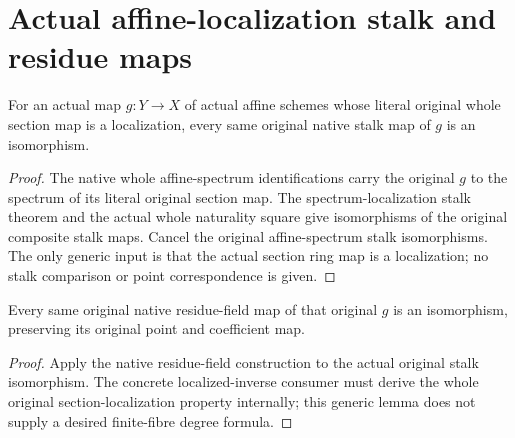 \section{Actual affine-localization stalk and residue maps}

\begin{theorem}
\label{thm:fc-affine-localization-native-stalks}
\leanok
{}
For an actual map $g:Y\to X$ of actual affine schemes whose literal original
whole section map is a localization, every same original native stalk map
of $g$ is an isomorphism.
\end{theorem}
\begin{proof}
The native whole affine-spectrum identifications carry the original $g$ to
the spectrum of its literal original section map.  The spectrum-localization
stalk theorem and the actual whole naturality square give isomorphisms of
the original composite stalk maps.  Cancel the original affine-spectrum
stalk isomorphisms.  The only generic input is that the actual section ring
map is a localization; no stalk comparison or point correspondence is given.
\end{proof}

\begin{theorem}
\label{thm:fc-affine-localization-native-residue-fields}
\leanok
{}
Every same original native residue-field map of that original $g$ is an
isomorphism, preserving its original point and coefficient map.
\end{theorem}
\begin{proof}
Apply the native residue-field construction to the actual original stalk
isomorphism.  The concrete localized-inverse consumer must derive the
whole original section-localization property internally; this generic
lemma does not supply a desired finite-fibre degree formula.
\end{proof}
